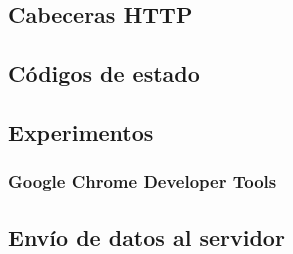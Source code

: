 \documentclass[a4paper,11pt,spanish]{sphinxmanual}
\begin{document}
\subsection{Cabeceras HTTP}
\label{\detokenize{introduccion:cabeceras-http}}

\subsection{Códigos de estado}
\label{\detokenize{introduccion:codigos-de-estado}}

\subsection{Experimentos}
\label{\detokenize{introduccion:experimentos}}

\subsubsection{}
\label{\detokenize{introduccion:telnet}}

\subsubsection{}
\label{\detokenize{introduccion:netcat}}

\subsubsection{}
\label{\detokenize{introduccion:curl}}

\subsubsection{}
\label{\detokenize{introduccion:http}}

\subsubsection{Google Chrome Developer Tools}
\label{\detokenize{introduccion:google-chrome-developer-tools}}

\subsection{Envío de datos al servidor}
\label{\detokenize{introduccion:envio-de-datos-al-servidor}}
\end{document}
